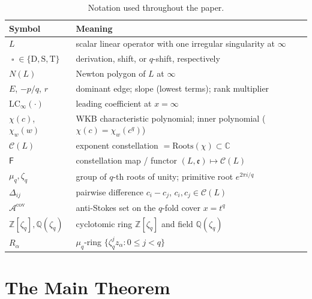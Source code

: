 \documentclass[aip,jmp,preprint,amsmath,amssymb,nofootinbib,floatfix]{revtex4-2}
\theoremstyle{plain}
\theoremstyle{definition}
\theoremstyle{remark}
\newcommand{\op}{\mathop{\square}}                %
\newcommand{\opD}{\mathrm{D}}                     %
\newcommand{\opS}{\mathrm{S}}                     %
\newcommand{\opT}{\mathrm{T}}                     %
\newcommand{\LCinf}{\mathrm{LC}_\infty}
\newcommand{\Roots}{\mathrm{Roots}}
\newcommand{\NL}{N(L)}
\newcommand{\Cl}{\mathcal{C}}
\newcommand{\Fclass}{\mathsf{F}}
\newcommand{\Acov}{\mathcal{A}^{\mathrm{cov}}}
\newcommand{\Dij}{\Delta_{ij}}
\newcommand{\Zlc}{\mathbb{Z}[\zeta_q]}
\newcommand{\Qlc}{\mathbb{Q}(\zeta_q)}
\begin{document}
\begin{table}[t]
\centering
\small
\begin{tabular}{@{}ll@{}}
\toprule
\textbf{Symbol} & \textbf{Meaning} \\
\midrule
$L$            & scalar linear operator with one irregular singularity at $\infty$ \\
$\op \in \{\opD, \opS, \opT\}$
               & derivation, shift, or $q$-shift, respectively \\
$\NL$          & Newton polygon of $L$ at $\infty$ \\
$E$, $-p/q$, $r$
               & dominant edge; slope (lowest terms); rank multiplier \\
$\LCinf(\cdot)$ & leading coefficient at $x = \infty$ \\
$\chi(c)$, $\chi_w(w)$
               & WKB characteristic polynomial; inner polynomial ($\chi(c) = \chi_w(c^q)$) \\
$\Cl(L)$       & exponent constellation $= \Roots(\chi) \subset \mathbb{C}$ \\
$\Fclass$      & constellation map / functor $(L, \mathfrak{e}) \mapsto \Cl(L)$ \\
$\mu_q, \zeta_q$
               & group of $q$-th roots of unity; primitive root $e^{2\pi i / q}$ \\
$\Dij$         & pairwise difference $c_i - c_j$, $c_i, c_j \in \Cl(L)$ \\
$\Acov$        & anti-Stokes set on the $q$-fold cover $x = t^q$ \\
$\Zlc, \Qlc$   & cyclotomic ring $\mathbb{Z}[\zeta_q]$ and field $\mathbb{Q}(\zeta_q)$ \\
$R_\alpha$     & $\mu_q$-ring $\{\zeta_q^j z_\alpha : 0 \le j < q\}$ \\
\bottomrule
\end{tabular}
\caption{Notation used throughout the paper.}\label{tab:notation}
\end{table}


\section{The Main Theorem}\label{sec:main}
\end{document}
